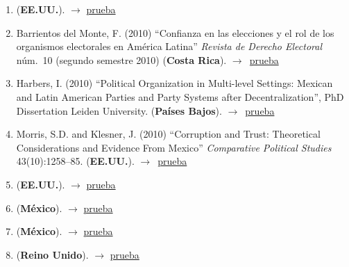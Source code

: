 \documentclass[12 pt, letter]{article}
\newenvironment{CitasMiTrabajo}{
    \begin{footnotesize}
    \begin{enumerate}[label={\footnotesize\emph{cita~\arabic*}},ref=\arabic*] %
        \setlength{\itemsep}{.1\itemsep}
        \setlength{\parskip}{.1\parskip}
    }{\end{enumerate}\end{footnotesize}}
\begin{document}
\begin{CitasMiTrabajo}
        \item {} (\textbf{EE.UU.}).  $\rightarrow$ \href{http://ericmagar.com/cv/cites/estevezEtalElecStud/bumin2009phd.pdf}{prueba}

        \item Barrientos del Monte, F. (2010) ``Confianza en las elecciones y el rol de los organismos electorales en Am\'erica Latina'' \emph{Revista de Derecho Electoral} n\'um.\ 10 (segundo semestre 2010) (\textbf{Costa Rica}). $\rightarrow$~\href{http://ericmagar.com/cv/cites/estevezEtalElecStud/Barrientos.pdf}{prueba}

        \item Harbers, I. (2010)
            ``Political Organization	in Multi-level Settings: Mexican and Latin American Parties and Party Systems after Decentralization'', PhD Dissertation Leiden University. (\textbf{Pa\'ises Bajos}). $\rightarrow$~\href{http://ericmagar.com/cv/cites/estevezEtalElecStud/harbers.excerpt.pdf}{prueba}

        \item Morris, S.D. and Klesner, J. (2010)
            ``Corruption and Trust: Theoretical Considerations and Evidence From Mexico''
            \emph{Comparative Political Studies} 43(10):1258--85. (\textbf{EE.UU.}). $\rightarrow$~\href{http://ericmagar.com/cv/cites/estevezEtalElecStud/morris.klesnerCorruptionTrustMx2010cps.pdf}{prueba}

        \item {} (\textbf{EE.UU.}).  $\rightarrow$ \href{http://ericmagar.com/cv/cites/estevezEtalElecStud/fowler2010phd.pdf}{prueba}

        \item {} (\textbf{M\'exico}).  $\rightarrow$ \href{http://ericmagar.com/cv/cites/estevezEtalElecStud/diazSandoval2011phd.pdf}{prueba}

        \item {} (\textbf{M\'exico}).  $\rightarrow$ \href{http://ericmagar.com/cv/cites/estevezEtalElecStud/barrientos2011.pdf}{prueba}

        \item {} (\textbf{Reino Unido}).  $\rightarrow$ \href{http://ericmagar.com/cv/cites/estevezEtalElecStud/birch2011.pdf}{prueba}


\end{CitasMiTrabajo}
\end{document}
